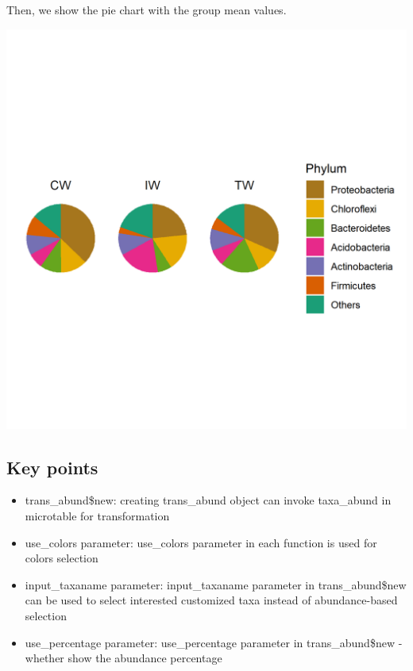 \documentclass[
]{book}
\newenvironment{Shaded}{\begin{snugshade}}{\end{snugshade}}
\newcommand{\AttributeTok}[1]{\textcolor[rgb]{0.77,0.63,0.00}{#1}}
\newcommand{\CommentTok}[1]{\textcolor[rgb]{0.56,0.35,0.01}{\textit{#1}}}
\newcommand{\DecValTok}[1]{\textcolor[rgb]{0.00,0.00,0.81}{#1}}
\newcommand{\FunctionTok}[1]{\textcolor[rgb]{0.00,0.00,0.00}{#1}}
\newcommand{\NormalTok}[1]{#1}
\newcommand{\OtherTok}[1]{\textcolor[rgb]{0.56,0.35,0.01}{#1}}
\newcommand{\SpecialCharTok}[1]{\textcolor[rgb]{0.00,0.00,0.00}{#1}}
\newcommand{\StringTok}[1]{\textcolor[rgb]{0.31,0.60,0.02}{#1}}
\providecommand{\tightlist}{%
  \setlength{\itemsep}{0pt}\setlength{\parskip}{0pt}}
\begin{document}
Then, we show the pie chart with the group mean values.

\begin{Shaded}
\end{Shaded}

\begin{center}\includegraphics[width=600px]{Images/plot_pie} \end{center}

\hypertarget{key-points-1}{%
\subsection{Key points}\label{key-points-1}}

\begin{itemize}
\tightlist
\item
  trans\_abund\$new: creating trans\_abund object can invoke taxa\_abund in microtable for transformation
\item
  use\_colors parameter: use\_colors parameter in each function is used for colors selection
\item
  input\_taxaname parameter: input\_taxaname parameter in trans\_abund\$new can be used to select interested customized taxa instead of abundance-based selection
\item
  use\_percentage parameter: use\_percentage parameter in trans\_abund\$new - whether show the abundance percentage
\end{itemize}
\end{document}

